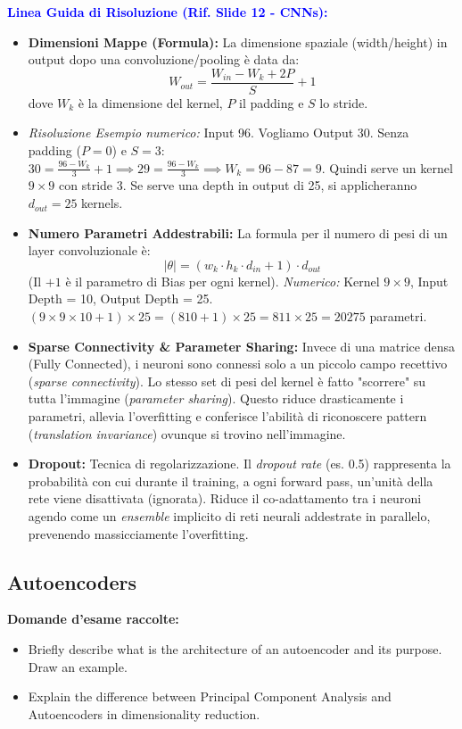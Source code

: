 \documentclass[11pt,a4paper]{article}
\begin{document}
\textbf{\textcolor{blue}{Linea Guida di Risoluzione (Rif. Slide 12 - CNNs):}}
\begin{itemize}
    \item \textbf{Dimensioni Mappe (Formula):} La dimensione spaziale (width/height) in output dopo una convoluzione/pooling è data da:
    $$ W_{out} = \frac{W_{in} - W_k + 2P}{S} + 1 $$
    dove $W_k$ è la dimensione del kernel, $P$ il padding e $S$ lo stride.
    \item \textit{Risoluzione Esempio numerico:} Input 96. Vogliamo Output 30. Senza padding ($P=0$) e $S=3$: $30 = \frac{96 - W_k}{3} + 1 \implies 29 = \frac{96 - W_k}{3} \implies W_k = 96 - 87 = 9$. Quindi serve un kernel $9 \times 9$ con stride 3. Se serve una depth in output di 25, si applicheranno $d_{out} = 25$ kernels.
    \item \textbf{Numero Parametri Addestrabili:} La formula per il numero di pesi di un layer convoluzionale è:
    $$ |\theta| = (w_k \cdot h_k \cdot d_{in} + 1) \cdot d_{out} $$
    (Il $+1$ è il parametro di Bias per ogni kernel).
    \textit{Numerico:} Kernel $9 \times 9$, Input Depth = 10, Output Depth = 25. \\ $(9 \times 9 \times 10 + 1) \times 25 = (810 + 1) \times 25 = 811 \times 25 = 20275$ parametri.
    \item \textbf{Sparse Connectivity \& Parameter Sharing:} Invece di una matrice densa (Fully Connected), i neuroni sono connessi solo a un piccolo campo recettivo (\textit{sparse connectivity}). Lo stesso set di pesi del kernel è fatto "scorrere" su tutta l'immagine (\textit{parameter sharing}). Questo riduce drasticamente i parametri, allevia l'overfitting e conferisce l'abilità di riconoscere pattern (\textit{translation invariance}) ovunque si trovino nell'immagine.
    \item \textbf{Dropout:} Tecnica di regolarizzazione. Il \textit{dropout rate} (es. 0.5) rappresenta la probabilità con cui durante il training, a ogni forward pass, un'unità della rete viene disattivata (ignorata). Riduce il co-adattamento tra i neuroni agendo come un \textit{ensemble} implicito di reti neurali addestrate in parallelo, prevenendo massicciamente l'overfitting.
\end{itemize}

\subsection{Autoencoders}
\textbf{Domande d'esame raccolte:}
\begin{itemize}
    \item Briefly describe what is the architecture of an autoencoder and its purpose. Draw an example.
    \item Explain the difference between Principal Component Analysis and Autoencoders in dimensionality reduction.
\end{itemize}
\end{document}
